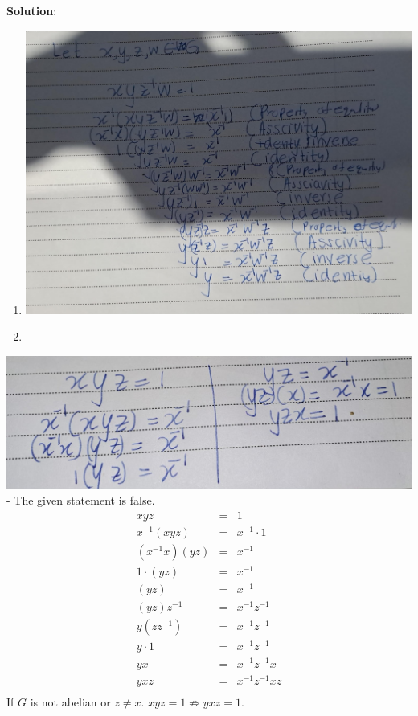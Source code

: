 \documentclass[
]{book}
\providecommand{\tightlist}{%
  \setlength{\itemsep}{0pt}\setlength{\parskip}{0pt}}
\theoremstyle{definition}
\theoremstyle{definition}
\theoremstyle{definition}
\theoremstyle{definition}
\theoremstyle{remark}
\begin{document}
\textbf{Solution}:

\begin{enumerate}
\def\labelenumi{\alph{enumi}.}
\tightlist
\item
  \hfill\break
  \includegraphics{figures/ch_2/fig17.jpg}
\item
  \hfill\break
\end{enumerate}

\includegraphics{figures/ch_2/fig18.jpg}
- The given statement is false.
\begin{eqnarray}
          xyz&=&1\\
  x^{-1}(xyz)&=&x^{-1} \cdot 1\\
  (x^{-1}x)(yz)&=&x^{-1}\\
  1 \cdot(yz)&=&x^{-1}\\
  (yz)&=&x^{-1}\\
  (yz)z^{-1}&=&x^{-1}z^{-1}\\
  y(zz^{-1})&=&x^{-1}z^{-1}\\
  y \cdot 1&=&x^{-1}z^{-1}\\
  yx&=&x^{-1}z^{-1}x\\
  yxz&=&x^{-1}z^{-1}xz\\
\end{eqnarray}
If \(G\) is not abelian or \(z\neq x\). \(xyz=1 \nRightarrow yxz=1\).
\end{document}
